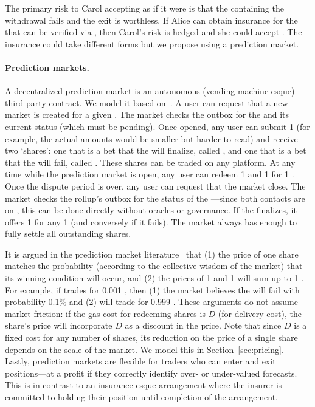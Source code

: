The primary risk to Carol accepting \ethxx as if it were \ethone is that the \rblock containing the \ethxx withdrawal fails and the exit is worthless. If Alice can obtain insurance for the \ethxx that can be verified via \layerone, then Carol's risk is hedged and she could accept \ethxx. The insurance could take different forms but we propose using a prediction market.

\paragraph{Prediction markets.} A decentralized prediction market is an autonomous (\eg vending machine-esque) third party \layerone contract. We model it based on~\cite{clark2014decentralizing}. A user can request that a new market is created for a given \rblock. The market checks the outbox for the \rblock and its current status (which must be pending). Once opened, any user can submit 1 \ethone (for example, the actual amounts would be smaller but harder to read) and receive two `shares': one that is a bet that the \rblock will finalize, called \final, and one that is a bet that the \rblock will fail, called \fail. These shares can be traded on any platform. At any time while the prediction market is open, any user can redeem 1 \final and 1 \fail for 1 \ethone. Once the dispute period is over, any user can request that the market close. The market checks the rollup's outbox for the status of the \rblock---since both contacts are on \layerone, this can be done directly without oracles or governance. If the \rblock finalizes, it offers 1 \ethone for any 1 \final (and conversely if it fails). The market always has enough \ethone to fully settle all outstanding shares.

It is argued in the prediction market literature~\cite{clark2014decentralizing} that (1) the price of one share matches the probability (according to the collective wisdom of the market) that its winning condition will occur, and (2) the prices of 1 \final and 1 \fail will sum up to 1 \ethone. For example, if \fail trades for 0.001 \ethone, then (1) the market believes the \rblock will fail with probability 0.1\% and (2) \final will trade for  0.999 \ethone. These arguments do not assume market friction: if the gas cost for redeeming shares is $D$ (for delivery cost), the share's price will incorporate $D$ as a discount in the price. Note that since $D$ is a fixed cost for any number of shares, its reduction on the price of a single share depends on the scale of the market. We model this in Section~\ref{sec:pricing}. Lastly, prediction markets are flexible for traders who can enter and exit positions---at a profit if they correctly identify over- or under-valued forecasts. This is in contrast to an insurance-esque arrangement where the insurer is committed to holding their position until completion of the arrangement.

